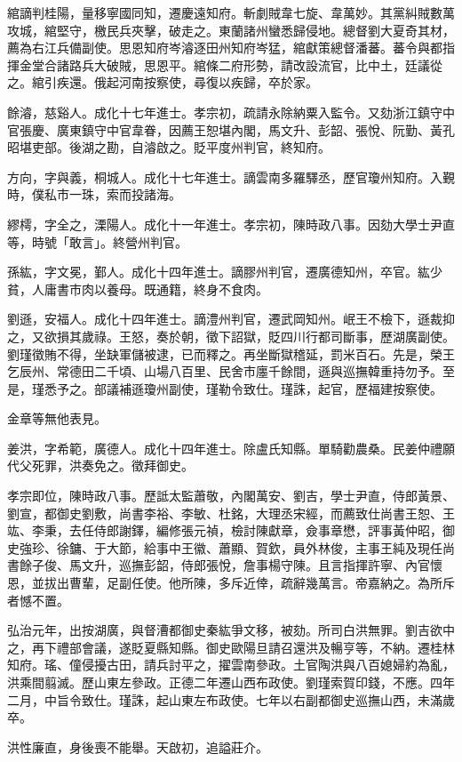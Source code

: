 \begin{pinyinscope}
綰謫判桂陽，量移寧國同知，遷慶遠知府。斬劇賊韋七旋、韋萬妙。其黨糾賊數萬攻城，綰堅守，檄民兵夾擊，破走之。東蘭諸州蠻悉歸侵地。總督劉大夏奇其材，薦為右江兵備副使。思恩知府岑濬逐田州知府岑猛，綰獻策總督潘蕃。蕃令與都指揮金堂合諸路兵大破賊，思恩平。綰條二府形勢，請改設流官，比中土，廷議從之。綰引疾還。俄起河南按察使，尋復以疾歸，卒於家。

餘濬，慈谿人。成化十七年進士。孝宗初，疏請永除納粟入監令。又劾浙江鎮守中官張慶、廣東鎮守中官韋眷，因薦王恕堪內閣，馬文升、彭韶、張悅、阮勤、黃孔昭堪吏部。後湖之勘，自濬啟之。貶平度州判官，終知府。

方向，字與義，桐城人。成化十七年進士。謫雲南多羅驛丞，歷官瓊州知府。入覲時，僕私市一珠，索而投諸海。

繆樗，字全之，溧陽人。成化十一年進士。孝宗初，陳時政八事。因劾大學士尹直等，時號「敢言」。終營州判官。

孫紘，字文冕，鄞人。成化十四年進士。謫膠州判官，遷廣德知州，卒官。紘少貧，人庸書市肉以養母。既通籍，終身不食肉。

劉遜，安福人。成化十四年進士。謫澧州判官，遷武岡知州。岷王不檢下，遜裁抑之，又欲損其歲祿。王怒，奏於朝，徵下詔獄，貶四川行都司斷事，歷湖廣副使。劉瑾徵賄不得，坐缺軍儲被逮，已而釋之。再坐斷獄稽延，罰米百石。先是，榮王乞辰州、常德田二千頃、山場八百里、民舍市廛千餘間，遜與巡撫韓重持勿予。至是，瑾悉予之。部議補遜瓊州副使，瑾勒令致仕。瑾誅，起官，歷福建按察使。

金章等無他表見。

姜洪，字希範，廣德人。成化十四年進士。除盧氏知縣。單騎勸農桑。民姜仲禮願代父死罪，洪奏免之。徵拜御史。

孝宗即位，陳時政八事。歷詆太監蕭敬，內閣萬安、劉吉，學士尹直，侍郎黃景、劉宣，都御史劉敷，尚書李裕、李敏、杜銘，大理丞宋經，而薦致仕尚書王恕、王竑、李秉，去任侍郎謝鐸，編修張元禎，檢討陳獻章，僉事章懋，評事黃仲昭，御史強珍、徐鏞、于大節，給事中王徽、蕭顯、賀欽，員外林俊，主事王純及現任尚書餘子俊、馬文升，巡撫彭韶，侍郎張悅，詹事楊守陳。且言指揮許寧、內官懷恩，並拔出曹輩，足副任使。他所陳，多斥近倖，疏辭幾萬言。帝嘉納之。為所斥者憾不置。

弘治元年，出按湖廣，與督漕都御史秦紘爭文移，被劾。所司白洪無罪。劉吉欲中之，再下禮部會議，遂貶夏縣知縣。御史歐陽旦請召還洪及暢亨等，不納。遷桂林知府。瑤、僮侵擾古田，請兵討平之，擢雲南參政。土官陶洪與八百媳婦約為亂，洪乘間翦滅。歷山東左參政。正德二年遷山西布政使。劉瑾索賀印錢，不應。四年二月，中旨令致仕。瑾誅，起山東左布政使。七年以右副都御史巡撫山西，未滿歲卒。

洪性廉直，身後喪不能舉。天啟初，追謚莊介。


\end{pinyinscope}
